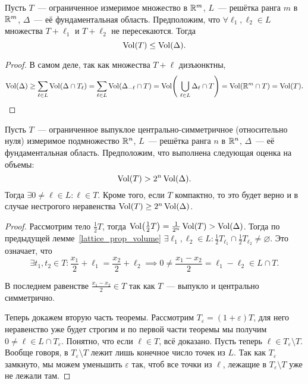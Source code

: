 	\begin{lemma}\label{lattice_prop_volume}
		Пусть $T$~--- ограниченное измеримое множество в $\mathbb{R}^m$, $L$~--- решётка ранга $m$ в $\mathbb{R}^m$, $\Delta$~--- её фундаментальная область. Предположим, что $\forall \ell_1, \ell_2 \in L $ множества $T + \ell_1$ и $T + \ell_2$ не пересекаются.  Тогда 
		\[
			\operatorname{Vol}(T) \le \operatorname{Vol}(\Delta).
		\]
	\end{lemma}
	\begin{proof}
		В самом деле, так как множества  $T + \ell$ дизъюнктны, 
		\[
			\Vol(\Delta) \ge \sum_{\ell \in L} \Vol(\Delta \cap T_{\ell}) = \sum_{\ell \in L} \Vol(\Delta_{-\ell} \cap T) = \Vol\lr*{\ \bigcup_{\ell \in L} \Delta_{\ell} \cap T} = \Vol(\R^m \cap T) = \Vol(T).
		\]
	\end{proof}

	\begin{lemma}\label{Mink_theorem}
		Пусть $T$~--- ограниченное выпуклое центрально-симметричное (относительно нуля) измеримое подмножество $\mathbb{R}^n$, $L$~--- решётка ранга $n$ в $\mathbb{R}^n$, $\Delta$~--- её фундаментальная область. Предположим, что выполнена следующая оценка на объемы:
		\[
			\operatorname{Vol}(T) > 2^n \operatorname{Vol}(\Delta).
		\]
		Тогда $\exists 0 \neq \ell \in L\colon \ell \in T$. Кроме того, если $T$ компактно, то это будет верно и в случае нестрогого неравенства $\operatorname{Vol}(T) \ge 2^n \operatorname{Vol}(\Delta)$.
	\end{lemma}
	\begin{proof}
		Рассмотрим тело $\frac{1}{2}T$, тогда $\Vol\lr*{\frac{1}{2}T} = \frac{1}{2^n} \Vol(T) > \Vol(\Delta)$. Тогда по предыдущей лемме~\ref{lattice_prop_volume}  $\exists \ell_1, \ell_2 \in L\colon \frac{1}{2}T_{\ell_1} \cap \frac{1}{2}T_{\ell_{2}} \neq \varnothing$. Это означает, что
		 \[ \exists t_1, t_2 \in T\colon \frac{x_1}{2} + \ell_1 = \frac{x_2}{2} + \ell_2 \implies 0 \neq \frac{x_1 - x_2}{2} = \ell_1 - \ell_2 \in L \cap T.\]

		 В последнем равенстве $\frac{x_1 - x_2}{2} \in T$ так как $T$~--- выпукло и центрально симметрично. 

		 Теперь докажем вторую часть теоремы. Рассмотрим $T_{\varepsilon} = (1 + \varepsilon)T$, для него неравенство уже будет строгим и по первой части теоремы мы получим $0\neq \ell \in L \cap T_{\varepsilon}$. Понятно, что если $\ell \in T$, всё доказано. Пусть теперь $\ell \in T_{\varepsilon} \setminus T$. Вообще говоря, в $T_{\varepsilon} \setminus T$  лежит лишь конечное число точек из $L$. Так как $T_{\varepsilon}$ замкнуто, мы можем уменьшить $\varepsilon$ так, чтоб все точки из $\ell$, лежащие в $T_{\varepsilon}\setminus T$ уже не лежали там. 
	\end{proof}

